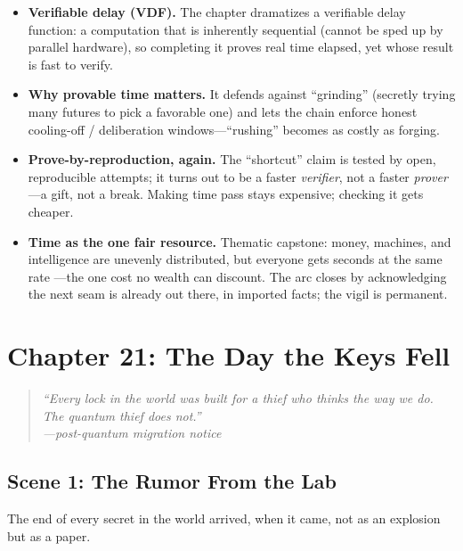 \documentclass[12pt,letterpaper]{book}
\providecommand{\tightlist}{\setlength{\itemsep}{0pt}\setlength{\parskip}{0pt}}
\begin{document}
\begin{itemize}
\tightlist
\item
  \textbf{Verifiable delay (VDF).} The chapter dramatizes a verifiable delay
  function: a computation that is inherently sequential (cannot be sped up by
  parallel hardware), so completing it proves real time elapsed, yet whose result
  is fast to verify.
\item
  \textbf{Why provable time matters.} It defends against ``grinding'' (secretly
  trying many futures to pick a favorable one) and lets the chain enforce honest
  cooling-off / deliberation windows---``rushing'' becomes as costly as forging.
\item
  \textbf{Prove-by-reproduction, again.} The ``shortcut'' claim is tested by open,
  reproducible attempts; it turns out to be a faster \emph{verifier}, not a faster
  \emph{prover}---a gift, not a break. Making time pass stays expensive; checking
  it gets cheaper.
\item
  \textbf{Time as the one fair resource.} Thematic capstone: money, machines, and
  intelligence are unevenly distributed, but everyone gets seconds at the same rate
  ---the one cost no wealth can discount. The arc closes by acknowledging the next
  seam is already out there, in imported facts; the vigil is permanent.
\end{itemize}


\hypertarget{chapter-21-the-day-the-keys-fell}{%
\section{Chapter 21: The Day the Keys
Fell}\label{chapter-21-the-day-the-keys-fell}}

\begin{quote}
\itshape ``Every lock in the world was built for a thief who thinks the way we
do. The quantum thief does not.''\\
\normalfont\hfill---post-quantum migration notice
\end{quote}

\hypertarget{scene-1-the-rumor-from-the-lab}{%
\subsection{Scene 1: The Rumor From the
Lab}\label{scene-1-the-rumor-from-the-lab}}

The end of every secret in the world arrived, when it came, not as an explosion
but as a paper.
\end{document}
